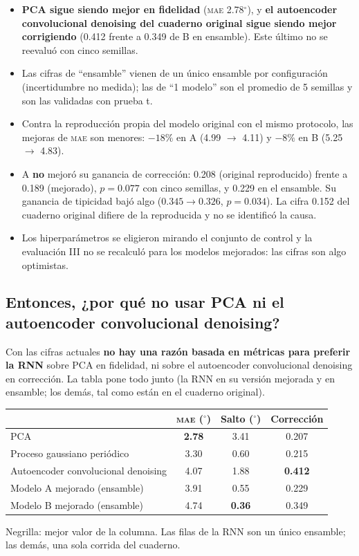 \documentclass[11pt,a4paper]{article}
\newcommand{\gr}{$^\circ$}
\newcommand{\mae}{\textsc{mae}}
\begin{document}
\begin{cuidado}
\begin{itemize}
\item \textbf{PCA sigue siendo mejor en fidelidad} (\mae{} 2.78\gr), y \textbf{el autoencoder convolucional denoising del cuaderno original sigue siendo mejor corrigiendo} (0.412 frente a 0.349 de B en ensamble). Este último no se reevaluó con cinco semillas.
\item Las cifras de ``ensamble'' vienen de un único ensamble por configuración (incertidumbre no medida); las de ``1 modelo'' son el promedio de 5 semillas y son las validadas con prueba t.
\item Contra la reproducción propia del modelo original con el mismo protocolo, las mejoras de \mae{} son menores: $-18\%$ en A (4.99 $\to$ 4.11) y $-8\%$ en B (5.25 $\to$ 4.83).
\item A \textbf{no} mejoró su ganancia de corrección: 0.208 (original reproducido) frente a 0.189 (mejorado), $p=0.077$ con cinco semillas, y 0.229 en el ensamble. Su ganancia de tipicidad bajó algo ($0.345\to0.326$, $p=0.034$). La cifra 0.152 del cuaderno original difiere de la reproducida y no se identificó la causa.
\item Los hiperparámetros se eligieron mirando el conjunto de control y la evaluación III no se recalculó para los modelos mejorados: las cifras son algo optimistas.
\end{itemize}
\end{cuidado}

\subsection*{Entonces, ¿por qué no usar PCA ni el autoencoder convolucional denoising?}

Con las cifras actuales \textbf{no hay una razón basada en métricas para preferir la RNN} sobre PCA en fidelidad, ni sobre el autoencoder convolucional denoising en corrección. La tabla pone todo junto (la RNN en su versión mejorada y en ensamble; los demás, tal como están en el cuaderno original).

\begin{center}
\small
\begin{tabular}{lccc}
\toprule
 & \textbf{\mae{} (\gr)} & \textbf{Salto (\gr)} & \textbf{Corrección} \\
\midrule
PCA & \textbf{2.78} & 3.41 & 0.207 \\
Proceso gaussiano periódico & 3.30 & 0.60 & 0.215 \\
Autoencoder convolucional denoising & 4.07 & 1.88 & \textbf{0.412} \\
Modelo A mejorado (ensamble) & 3.91 & 0.55 & 0.229 \\
Modelo B mejorado (ensamble) & 4.74 & \textbf{0.36} & 0.349 \\
\bottomrule
\end{tabular}
\end{center}
{\small Negrilla: mejor valor de la columna. Las filas de la RNN son un único ensamble; las demás, una sola corrida del cuaderno.}
\end{document}
